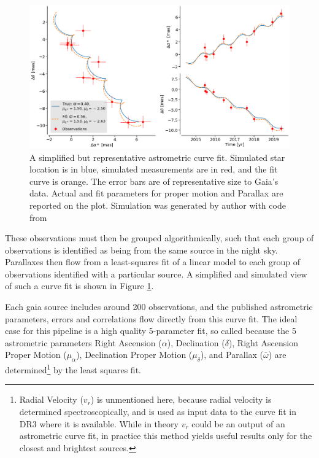 \documentclass[preprint2]{aastex631}
\begin{document}
\begin{figure}
	\includegraphics[width=\columnwidth]{astrometric-good.png}
	\caption{A simplified but representative astrometric curve fit. Simulated star location is in blue, simulated measurements are in red, and the fit curve is orange. The error bars are of representative size to Gaia's data. Actual and fit parameters for proper motion and Parallax are reported on the plot. Simulation was generated by author with code from \cite{luriGaia2018}}
	\label{fig:goodfit}
\end{figure}

These observations must then be grouped algorithmically, such that each group of observations is identified as being from the same source in the night sky. Parallaxes then flow from a least-squares fit of a linear model to each group of observations identified with a particular source. A simplified and simulated view of such a curve fit is shown in Figure \ref{fig:goodfit}. 

Each gaia source includes around 200 observations, and the published astrometric parameters, errors and correlations flow directly from this curve fit. The ideal case for this pipeline is a high quality 5-parameter fit, so called because the 5 astrometric parameters Right Ascension ($\alpha$), Declination ($\delta$), Right Ascension Proper Motion ($\mu_\alpha$), Declination Proper Motion ($\mu_\delta$), and Parallax ($\bar{\omega}$) are determined\footnote{Radial Velocity ($v_r$) is unmentioned here, because radial velocity is determined spectroscopically, and is used as input data to the curve fit in DR3 where it is available. While in theory $v_r$ could be an output of an astrometric curve fit, in practice this method yields useful results only for the closest and brightest sources\citep{lindegrenGaia2021a}.} by the least squares fit\citep{lindegrenGaia2021a}.
\end{document}
